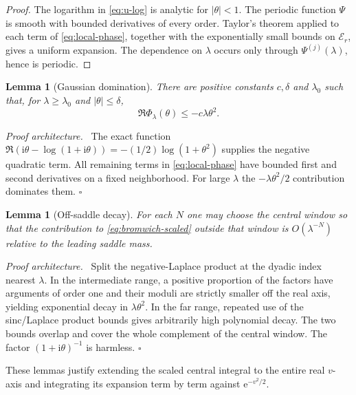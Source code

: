 \documentclass[11pt,oneside]{article}
\newtheorem{lemma}[theorem]{Lemma}
\theoremstyle{definition}
\theoremstyle{remark}
\newcommand{\e}{\mathrm e}
\newcommand{\ii}{\mathrm i}
\newenvironment{proofidea}{\par\smallskip\noindent\textit{Proof architecture.}\ }{\hfill$\square$\par\smallskip}
\begin{document}
\begin{proof}
The logarithm in \eqref{eq:u-log} is analytic for $|\theta|<1$.  The periodic function
$\Psi$ is smooth with bounded derivatives of every order.  Taylor's theorem applied to each
term of \eqref{eq:local-phase}, together with the exponentially small bounds on
$\mathcal E_r$, gives a uniform expansion.  The dependence on $\lambda$ occurs only through
$\Psi^{(j)}(\lambda)$, hence is periodic.
\end{proof}

\begin{lemma}[Gaussian domination]
There are positive constants $c,\delta$ and $\lambda_0$ such that, for
$\lambda\ge\lambda_0$ and $|\theta|\le\delta$,
\begin{equation}
 \Re\Phi_\lambda(\theta)\le-c\lambda\theta^2.             \label{eq:central-domination}
\end{equation}
\end{lemma}

\begin{proofidea}
The exact function $\Re(\ii\theta-\log(1+\ii\theta))
=-(1/2)\log(1+\theta^2)$ supplies the negative quadratic term.  All remaining terms in
\eqref{eq:local-phase} have bounded first and second derivatives on a fixed neighborhood.
For large $\lambda$ the $-\lambda\theta^2/2$ contribution dominates them.
\end{proofidea}

\begin{lemma}[Off-saddle decay]
For each $N$ one may choose the central window so that the contribution to
\eqref{eq:bromwich-scaled} outside that window is $O(\lambda^{-N})$ relative to the leading
saddle mass.
\end{lemma}

\begin{proofidea}
Split the negative-Laplace product at the dyadic index nearest $\lambda$.  In the intermediate
range, a positive proportion of the factors have arguments of order one and their moduli are
strictly smaller off the real axis, yielding exponential decay in $\lambda\theta^2$.  In the
far range, repeated use of the sinc/Laplace product bounds gives arbitrarily high polynomial
decay.  The two bounds overlap and cover the whole complement of the central window.  The
factor $(1+\ii\theta)^{-1}$ is harmless.
\end{proofidea}

These lemmas justify extending the scaled central integral to the entire real $v$-axis and
integrating its expansion term by term against $\e^{-v^2/2}$.
\end{document}
